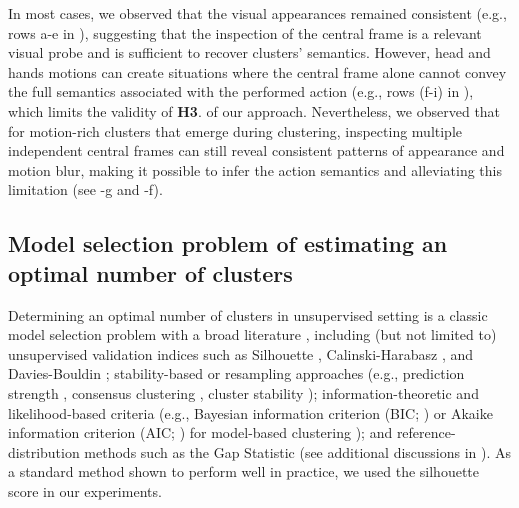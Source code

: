     In most cases, we observed that the visual appearances remained consistent (e.g., rows a-e in ), suggesting that the inspection of the central frame is a relevant visual probe and is sufficient to recover clusters' semantics. However, head and hands motions can create situations where the central frame alone cannot convey the full semantics associated with the performed action (e.g., rows (f-i) in ), which limits the validity of \textbf{H3}.  of our approach. Nevertheless, we observed that for motion-rich clusters that emerge during clustering, inspecting multiple independent central frames
    can still reveal consistent patterns of appearance and motion blur, making it possible to infer the action semantics and alleviating this limitation (see -g and -f).


    \subsection{Model selection problem of estimating an optimal number of clusters}
    \label{apd:chapter_5_model_selection_G}
        Determining an optimal number of clusters in unsupervised setting is a classic model selection problem with a broad literature \cite{stop_using_elbow, HENNIG201553, Sugar2003}, including (but not limited to) unsupervised validation indices such as Silhouette \cite{ROUSSEEUW198753}, Calinski-Harabasz \cite{Calinski01011974}, and Davies-Bouldin \cite{Davies1979}; stability-based or resampling approaches (e.g., prediction strength \cite{Tibshirani2005}, consensus clustering \cite{10.1162/153244303321897735, Monti2003}, cluster stability \cite{BenDor1999}); information-theoretic and likelihood-based criteria (e.g., Bayesian information criterion (BIC; \cite{Schwarz1978}) or Akaike information criterion (AIC; \cite{Akaike1998}) for model-based clustering \cite{Fraley2002}); and reference-distribution methods such as the Gap Statistic \cite{Tibshirani2001} (see additional discussions in \cite{HENNIG201553}). As a standard method shown to perform well in practice, we used the silhouette score in our experiments. 

